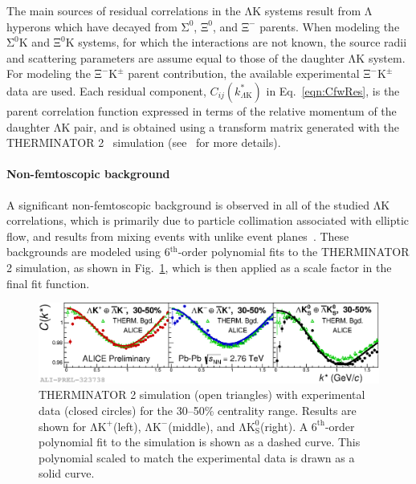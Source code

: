 \documentclass{svproc}
\newcommand{\Lam}{$\mathrm{\Lambda}$\xspace}
\newcommand{\LamK}{$\mathrm{\Lambda}\mathrm{K}$\xspace}
\newcommand{\LamKchP}{$\mathrm{\Lambda}\mathrm{K^{+}}$\xspace}
\newcommand{\LamKchM}{$\mathrm{\Lambda}\mathrm{K^{-}}$\xspace}
\newcommand{\LamKs}{$\mathrm{\Lambda}\mathrm{K^{0}_{S}}$\xspace}
\newcommand{\XiKpm}{$\mathrm{\Xi}^{-}\mathrm{K^{\pm}}$\xspace}
\begin{document}
The main sources of residual correlations in the \LamK systems result from \Lam hyperons which have decayed from $\mathrm{\Sigma}^{0}$, $\mathrm{\Xi}^{0}$, and $\mathrm{\Xi}^{-}$ parents.
When modeling the $\mathrm{\Sigma}^{0}$K and $\mathrm{\Xi}^{0}$K systems, for which the interactions are not known, the source radii and scattering parameters are assume equal to those of the daughter \LamK system.
For modeling the \XiKpm parent contribution, the available experimental \XiKpm data are used.
Each residual component, $C_{ij}(k^{*}_{\Lambda\mathrm{K}})$ in Eq.~\ref{eqn:CfwRes}, is the parent correlation function expressed in terms of the relative momentum of the daughter \LamK pair, and is obtained using a transform matrix generated with the THERMINATOR 2~\cite{Chojnacki:2011hb} simulation (see~\cite{Kisiel:2014mma} for more details).



\paragraph{Non-femtoscopic background}
\label{NonFlatBackground}


A significant non-femtoscopic background is observed in all of the studied \LamK correlations, which is primarily due to particle collimation associated with elliptic flow, and results from mixing events with unlike event planes~\cite{Kisiel:2017}.
These backgrounds are modeled using 6$^{\mathrm{th}}$-order polynomial fits to the THERMINATOR 2 simulation, as shown in Fig.~\ref{fig:BgdswTHERM}, which is then applied as a scale factor in the final fit function.


\begin{figure}[h]
  \centering
  \includegraphics[width=\textwidth]{./Figures/Approved/OtherFormats/EPS/2019-06-11-BgdwFitOnly_RandomEPs_NumWeight1_Full_AllAnwConj_3050.eps}
  \caption[Backgrounds with THERMINATOR 2]
  {
  THERMINATOR 2 simulation (open triangles) with experimental data (closed circles) for the 30--50\% centrality range.  
  Results are shown for \LamKchP (left), \LamKchM (middle), and \LamKs (right).
  A $6^{\mathrm{th}}$-order polynomial fit to the simulation is shown as a dashed curve.  
  This polynomial scaled to match the experimental data is drawn as a solid curve.
  }
  \label{fig:BgdswTHERM}
\end{figure} 
\end{document}
